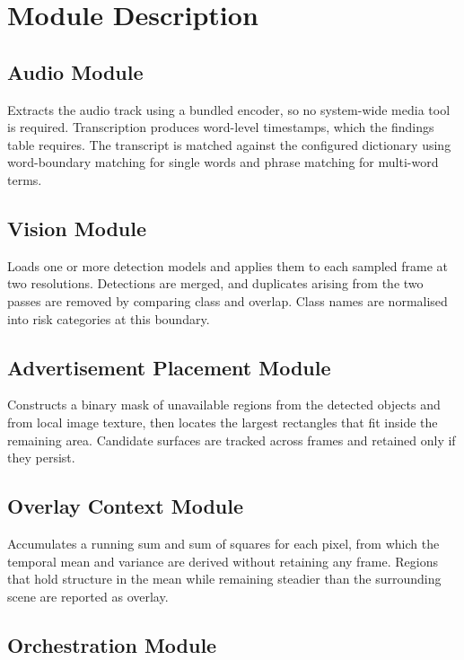 \documentclass[12pt,a4paper,twoside]{report}
\begin{document}
\section{Module Description}

\subsection{Audio Module}

Extracts the audio track using a bundled encoder, so no system-wide media tool is required. Transcription produces word-level timestamps, which the findings table requires. The transcript is matched against the configured dictionary using word-boundary matching for single words and phrase matching for multi-word terms.

\subsection{Vision Module}

Loads one or more detection models and applies them to each sampled frame at two resolutions. Detections are merged, and duplicates arising from the two passes are removed by comparing class and overlap. Class names are normalised into risk categories at this boundary.

\subsection{Advertisement Placement Module}

Constructs a binary mask of unavailable regions from the detected objects and from local image texture, then locates the largest rectangles that fit inside the remaining area. Candidate surfaces are tracked across frames and retained only if they persist.

\subsection{Overlay Context Module}

Accumulates a running sum and sum of squares for each pixel, from which the temporal mean and variance are derived without retaining any frame. Regions that hold structure in the mean while remaining steadier than the surrounding scene are reported as overlay.

\subsection{Orchestration Module}
\end{document}
